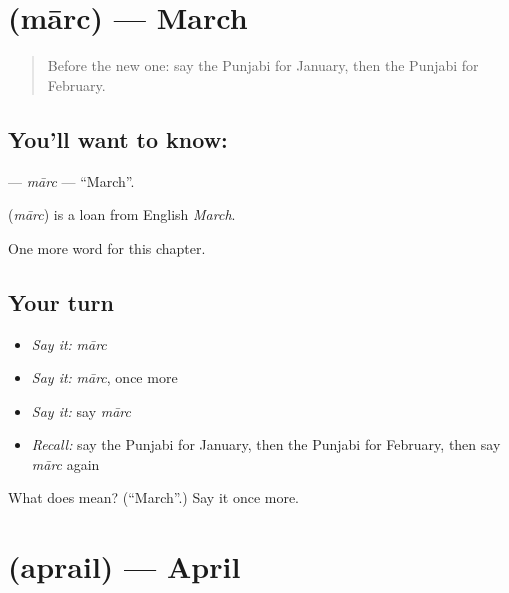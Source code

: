 \section[\texorpdfstring{\pa{ਮਾਰਚ} (mārc)}{ਮਾਰਚ (mārc)}]{ (mārc) — March}

\label{lesson:PA-C101-marc}



\begin{quote}
Before the new one: say the Punjabi for January, then the Punjabi for February.
\end{quote}

\subsection*{You'll want to know: }
\textbf{} — \emph{mārc} — \textquotedblleft{}March\textquotedblright{}.

\begin{cousinweb}
\textbf{} (\emph{mārc}) is a loan from English \emph{March}.
\end{cousinweb}

\begin{grammarlens}[title={What you've built}]
One more word for this chapter.
\end{grammarlens}

\subsection*{Your turn}
\begin{itemize}
\raggedright
  \item \emph{Say it:} \emph{mārc}
  \item \emph{Say it:} \emph{mārc}, once more
  \item \emph{Say it:} say \emph{mārc}
  \item \emph{Recall:} say the Punjabi for January, then the Punjabi for February, then say \emph{mārc} again
\end{itemize}

\begin{tcolorbox}[breakable,colback=teal!4,colframe=teal!35!black,title={Before you move on}]
What does  mean? (\textquotedblleft{}March\textquotedblright{}.) Say it once more.
\end{tcolorbox}
\section[\texorpdfstring{\pa{ਅਪ੍ਰੈਲ} (aprail)}{ਅਪ੍ਰੈਲ (aprail)}]{ (aprail) — April}

